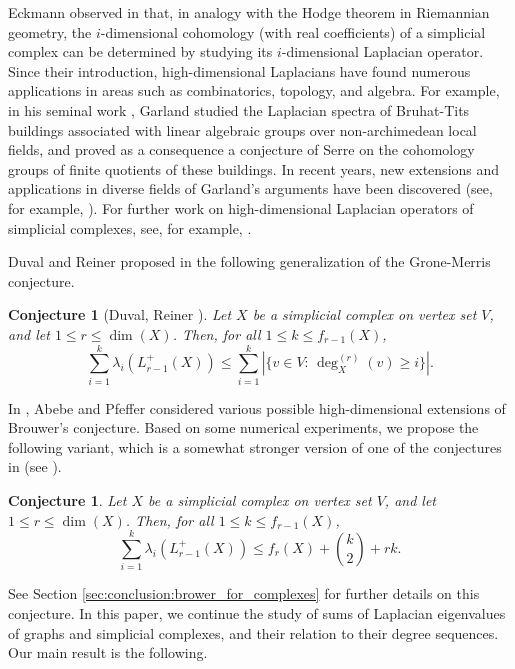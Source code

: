 \documentclass[a4paper,11pt]{article}
\theoremstyle{plain}
\newtheorem{conjecture}[theorem]{\bf Conjecture}
\theoremstyle{definition}
\numberwithin{theorem}{section}
\numberwithin{equation}{section}
\begin{document}
Eckmann observed in \cite{eckmann1945haromic} that, in analogy with the Hodge theorem in Riemannian geometry, the $i$-dimensional cohomology (with real coefficients) of a simplicial complex can be determined by studying its $i$-dimensional Laplacian operator.
 Since their introduction, high-dimensional Laplacians have found numerous applications in areas such as combinatorics, topology, and algebra. For example, in his seminal work \cite{garland1973padic}, Garland studied the Laplacian spectra of Bruhat-Tits buildings associated with linear algebraic groups over non-archimedean local fields, and proved as a consequence a conjecture of Serre on the cohomology groups of finite quotients of these buildings. 
In recent years, new extensions and applications in diverse fields of Garland's arguments have been discovered (see, for example, \cite{ballmann1997l2,zuk1996propriete,kahle2014sharp,aharoni2005eigenvalues,oppenheim2018local,anari2024log}). For further work on high-dimensional Laplacian operators of simplicial complexes, see, for example, \cite{kalai1983enumeration,kook2000combinatorial,horak2013spectra}.

Duval and Reiner proposed in \cite{duval2002shifted} the following   generalization of the Grone-Merris conjecture.

\begin{conjecture}[Duval, Reiner {\cite[Conjecture 1.2]{duval2002shifted}}]\label{conj:duval_reiner}
Let $X$ be a simplicial complex on vertex set $V$, and let $1\le r\le \dim(X)$. Then, for all $1\le k\le f_{r-1}(X)$,
\[
    \sum_{i=1}^k \lambda_i(L_{r-1}^{+}(X)) \le \sum_{i=1}^k \left| \{ v\in V:\, \deg_X^{(r)}(v)\ge i\}\right|.
\]
\end{conjecture}
In \cite{abebepartial,abebe2019conjectural}, Abebe and Pfeffer considered various possible high-dimensional extensions of Brouwer's conjecture. Based on some numerical experiments, we propose the following variant, which is a somewhat stronger version of one of the conjectures in \cite{abebepartial} (see \cite[Section 3.2.3]{abebepartial}).

\begin{conjecture}\label{conj:higher_brouwer}
   Let $X$ be a simplicial complex on vertex set $V$, and let $1\le r\le \dim(X)$. Then, for all $1\le k\le f_{r-1}(X)$,
\[
    \sum_{i=1}^k \lambda_i(L_{r-1}^{+}(X)) \le f_{r}(X) + \binom{k}{2}+rk.
\] 
\end{conjecture}
See Section \ref{sec:conclusion:brower_for_complexes} for further details on this conjecture. 
In this paper, we continue the study of sums of Laplacian eigenvalues of graphs and simplicial complexes, and their relation to their degree sequences. Our main result is the following.
\end{document}
